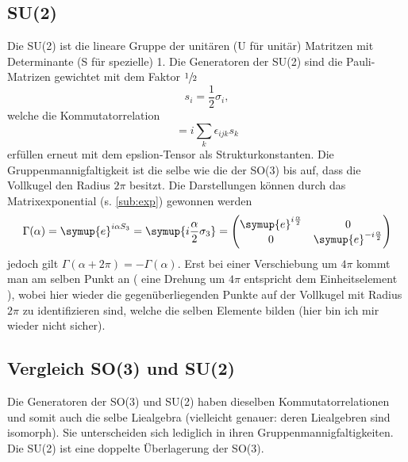 \documentclass[
  captions=tableheading,  %
  titlepage=firstiscover, %
]{scrartcl}
\begin{document}
\subsection{SU(2)}
Die SU(2) ist die lineare Gruppe der unitären (U für unitär) Matritzen mit Determinante (S für spezielle) 1.
Die Generatoren der SU(2) sind die Pauli-Matrizen gewichtet mit dem Faktor $\sfrac{1}{2}$
\begin{equation*}
  s_i = \frac{1}{2} \sigma_i,
\end{equation*}
welche die Kommutatorrelation 
\begin{equation*}
  [s_i, s_j] = i \sum_k \epsilon_{ijk} s_k
\end{equation*}
erfüllen erneut mit dem epslion-Tensor als Strukturkonstanten.
Die Gruppenmannigfaltigkeit ist die selbe wie die der SO(3) bis auf, dass die Vollkugel den Radius $2\pi$ besitzt.
Die Darstellungen können durch das Matrixexponential (s. \ref{sub:exp}) gewonnen werden
\begin{equation*}
  \Gamma(\alpha) = \symup{e}^{i\alpha S_3} = \symup{i\frac{\alpha}{2}\sigma_3} = 
  \begin{pmatrix}
    \symup{e}^{i\frac{\alpha}{2}} & 0                               \\
    0                             & \symup{e}^{-i\frac{\alpha}{2}}  \\
  \end{pmatrix}
\end{equation*}
jedoch gilt $\Gamma(\alpha + 2\pi) = - \Gamma(\alpha)$.
Erst bei einer Verschiebung um $4\pi$ kommt man am selben Punkt an (
  eine Drehung um $4\pi$ entspricht dem Einheitselement
), wobei hier wieder die gegenüberliegenden Punkte auf der Vollkugel 
mit Radius $2\pi$ zu identifizieren sind, welche 
die selben Elemente bilden ({\color{red}hier bin ich mir wieder nicht sicher}).
\subsection{Vergleich SO(3) und SU(2)}
Die Generatoren der SO(3) und SU(2) haben dieselben Kommutatorrelationen und somit auch die selbe Liealgebra
(vielleicht genauer: deren Liealgebren sind isomorph). 
Sie unterscheiden sich lediglich in ihren Gruppenmannigfaltigkeiten.
Die SU(2) ist eine doppelte Überlagerung der SO(3).
\end{document}
